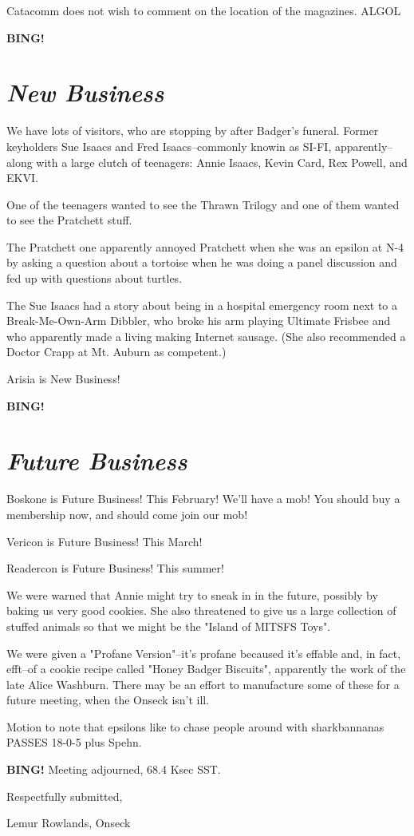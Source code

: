 \documentclass[10pt]{article}
\newcommand{\bing}{{\bf BING!} }
\newcommand{\goto}[1]{\bing \vskip 12pt \section*{{\em{#1}}}}
\newcommand{\ps}{ plus Spehn\xspace}
\newcommand{\onseck}{Lemur Rowlands, Onseck}
\begin{document}
Catacomm does not wish to comment on the location of the magazines.  ALGOL

\goto{New Business}

We have lots of visitors, who are stopping by after Badger's funeral.
Former keyholders Sue Isaacs and Fred Isaacs--commonly knowin as SI-FI, 
apparently--along with a large clutch of teenagers: Annie Isaacs, Kevin 
Card, Rex Powell, and EKVI.

One of the teenagers wanted to see the Thrawn Trilogy and one of them 
wanted to see the Pratchett stuff.  

The Pratchett one apparently annoyed Pratchett when 
she was an epsilon at N-4 by asking a question about a tortoise
when he was doing a panel discussion and fed up with questions
about turtles.

The Sue Isaacs had a story about being in a hospital emergency room
next to a Break-Me-Own-Arm Dibbler, who broke his arm playing
Ultimate Frisbee and who apparently made a living making Internet
sausage.  (She also recommended a Doctor Crapp at Mt. Auburn as
competent.)

Arisia is New Business!

\goto{Future Business}

Boskone is Future Business!  This February!  We'll have a mob!  You should
buy a membership now, and should come join our mob!

Vericon is Future Business!  This March!

Readercon is Future Business!  This summer!

We were warned that Annie might try to sneak in in the future,
possibly by baking us very good cookies.  She also threatened to
give us a large collection of stuffed animals so that we might
be the "Island of MITSFS Toys".

We were given a "Profane Version"--it's profane becaused it's effable and,
in fact, efft--of a cookie recipe called "Honey Badger Biscuits", apparently
the work of the late Alice Washburn.  There may be an effort to manufacture
some of these for a future meeting, when the Onseck isn't ill.

Motion to note that epsilons like to chase people around with
sharkbannanas PASSES 18-0-5\ps.

\bing
\noindent
Meeting adjourned, 68.4 Ksec SST.

\vspace{18pt}

\centerline{Respectfully submitted,}
\centerline{\onseck}
\end{document}
